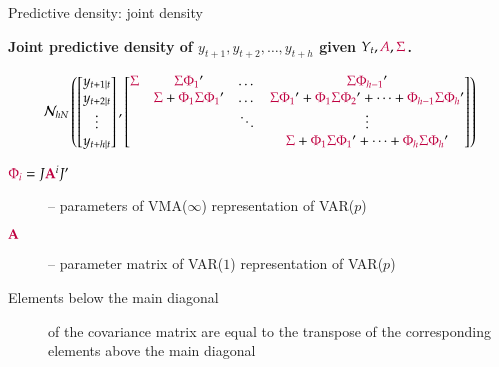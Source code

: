 \documentclass[notes,blackandwhite,mathsans,usenames,dvipsnames]{beamer}
\begin{document}
\begin{frame}{Predictive density: joint density}

\textbf{Joint predictive density of $y_{t+1}, y_{t+2}, \dots, y_{t+h}$ given $Y_t, {\color{purple}A},{\color{purple}\Sigma}$.}\footnotesize

$$
\mathcal{N}_{hN}\left(\begin{bmatrix} y_{t+1|t} \\ y_{t+2|t} \\ \vdots \\ y_{t+h|t} \end{bmatrix}, 
\begin{bmatrix} 
{\color{purple}\Sigma} & {\color{purple}\Sigma \Phi_1}' & \dots & {\color{purple}\Sigma \Phi_{h-1}}' \\ 
 & {\color{purple}\Sigma} + {\color{purple}\Phi_1\Sigma \Phi_1}' & \dots & {\color{purple}\Sigma\Phi_1}' + {\color{purple}\Phi_1\Sigma\Phi_2}' + \dots +{\color{purple}\Phi_{h-1}\Sigma\Phi_h}' \\
 &  & \ddots & \vdots\\
 &&& {\color{purple}\Sigma} + {\color{purple}\Phi_1\Sigma\Phi_1}' +  \dots + {\color{purple}\Phi_h\Sigma\Phi_h}'
 \end{bmatrix}\right)
$$

\normalsize
\bigskip\begin{description}
\item[${\color{purple}\Phi_i} = J{\color{purple}\mathbf{A}}^iJ'$] {\color{mcxs2}-- parameters of VMA($\infty$) representation of VAR($p$)}
\item[${\color{purple}\mathbf{A}}$] {\color{mcxs2}-- parameter matrix of VAR($1$) representation of VAR($p$)}

\bigskip\item[Elements below the main diagonal] {\color{mcxs2} of the covariance matrix are equal to the transpose of the corresponding elements above the main diagonal}
\end{description}

\end{frame}
\end{document}
